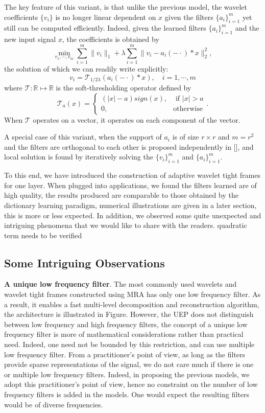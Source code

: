 \documentclass[a4paper]{article}
\begin{document}
The key feature of this variant, is that unlike the previous model, the wavelet coefficients $\{v_i\}$ is no longer linear dependent on $x$ given the filters $\{a_i\}_{i=1}^m$ yet still can be computed efficiently. Indeed, given the learned filters $\{a_i\}_{i=1}^m$ and the new input signal $x$, the coefficients is obtained by 
\[
	\min_{v_1,\cdots,v_m} \sum_{i=1}^m \|v_i\|_1 + \lambda \sum_{i=1}^m \|v_i - a_i(-\cdot)*x\|_2^2,
\]
the solution of which we can readily write explicitly:
\[
	v_i = \mathcal{T}_{1/2\lambda}( a_i(-\cdot)*x),\quad i=1,\cdots,m
\]
where $\mathcal{T}: \mathbb{R}\mapsto \mathbb{R}$ is the soft-thresholding operator defined by
\[
	\mathcal{T}_a(x)=\left\{ \begin{array}{lr}  (|x|-a)sign(x), &\textrm{ if } |x| > a \\0, &\textrm{otherwise}\end{array}\right . .
\]
When $\mathcal{T}$ operates on a vector, it operates on each component of the vector.


A special case of this variant, when the support of $a_i$ is of size $r\times r$ and $m=r^2$ and the filters are orthogonal to each other is proposed independently in [], and local solution is found by iteratively solving the $\{v_i\}_{i=1}^m$ and $\{a_i\}_{i=1}^m$.

To this end, we have introduced the construction of adaptive wavelet tight frames for one layer. When plugged into applications, we found the filters learned are of high quality, the results produced are comparable to those obtained by the dictionary learning paradigm, numerical illustrations are given in a later section, this is more or less expected.  In addition, we observed some quite unexpected and intriguing phenomena that we would like to share with the readers.
{\color{red} quadratic term needs to be verified}
\subsection{Some Intriguing Observations}
\textbf{A unique low frequency filter}. The most commonly used wavelets and wavelet tight frames constructed using MRA has only one low frequency filter. As a result, it enables a fast multi-level decomposition and reconstruction algorithm, the architecture is illustrated in Figure. However, the UEP does not distinguish between low frequency and high frequency filters, the concept of a unique low frequency  filter is more of mathematical considerations rather than practical need. Indeed, one need not be bounded by this restriction, and can use multiple low frequency filter. From a practitioner's point of view, as long as the filters provide sparse representations of the signal, we do not care much if there is one or multiple low frequency filters. Indeed, in proposing the previous models, we adopt this practitioner's point of view, hence no constraint on the number of low frequency filters is added in the models. One would expect the resulting filters would be of diverse frequencies.
\end{document}
